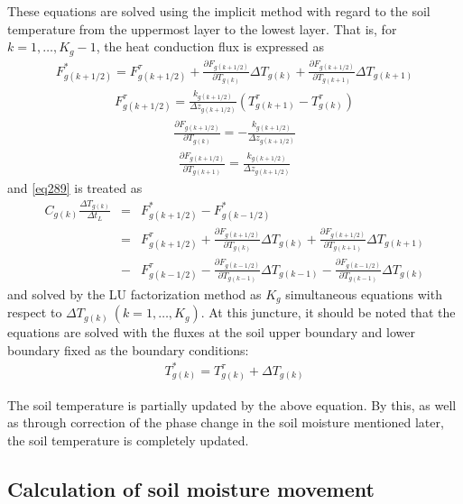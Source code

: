 These equations are solved using the implicit method with regard to the soil temperature from the uppermost layer to the lowest layer. That is, for \(k=1,\ldots,K_g-1\), the heat conduction flux is
expressed as \begin{eqnarray}
  F_{g(k+1/2)}^{\ast} = F_{g(k+1/2)}^{\tau}
+\frac{\partial {F}_{g(k+1/2)}}{\partial T_{g(k)}}
 \Delta T_{g(k)}
+\frac{\partial {F}_{g(k+1/2)}}{\partial T_{g(k+1)}}
 \Delta T_{g(k+1)}
\end{eqnarray} \begin{eqnarray}
  F_{g(k+1/2)}^{\tau} =
\frac{k_{g(k+1/2)}}{\Delta z_{g(k+1/2)}}(T_{g(k+1)}^{\tau} - T_{g(k)}^{\tau})
\end{eqnarray} \begin{eqnarray}
 \frac{\partial {F}_{g(k+1/2)}}{\partial T_{g(k)}} =
- \frac{k_{g(k+1/2)}}{\Delta z_{g(k+1/2)}}
\end{eqnarray} \begin{eqnarray}
 \frac{\partial {F}_{g(k+1/2)}}{\partial T_{g(k+1)}} =
\frac{k_{g(k+1/2)}}{\Delta z_{g(k+1/2)}}
\end{eqnarray} and \ref{eq289} is treated as \begin{eqnarray}
C_{g(k)} \frac{\Delta T_{g(k)}}{\Delta t_L}
&=& F_{g(k+1/2)}^\ast - {F}_{g(k-1/2)}^\ast  \nonumber\\
&=& {F}_{g(k+1/2)}^{\tau}
+\frac{\partial F_{g(k+1/2)}}{\partial T_{g(k)}}
 \Delta T_{g(k)}
+\frac{\partial F_{g(k+1/2)}}{\partial T_{g(k+1)}}
 \Delta T_{g(k+1)}  \nonumber\\
&-& F_{g(k-1/2)}^{\tau}
-\frac{\partial F_{g(k-1/2)}}{\partial T_{g(k-1)}}
 \Delta T_{g(k-1)}
-\frac{\partial F_{g(k-1/2)}}{\partial T_{g(k-1)}}
 \Delta T_{g(k)}
\end{eqnarray} and solved by the LU factorization method as \(K_{g}\) simultaneous equations with respect to \(\Delta T_{g(k)}\ (k=1,\ldots,K_{g})\). At this juncture, it should be noted that the equations are
solved with the fluxes at the soil upper boundary and lower boundary fixed as the boundary conditions: \begin{eqnarray}
 T_{g(k)}^\ast = T_{g(k)}^{\tau} + \Delta T_{g(k)}
\end{eqnarray}

The soil temperature is partially updated by the above equation. By this, as well as through correction of the phase change in the soil moisture mentioned later, the soil temperature is completely
updated.

\hypertarget{calculation-of-soil-moisture-movement}{%
\subsection{Calculation of soil moisture movement}\label{calculation-of-soil-moisture-movement}}


